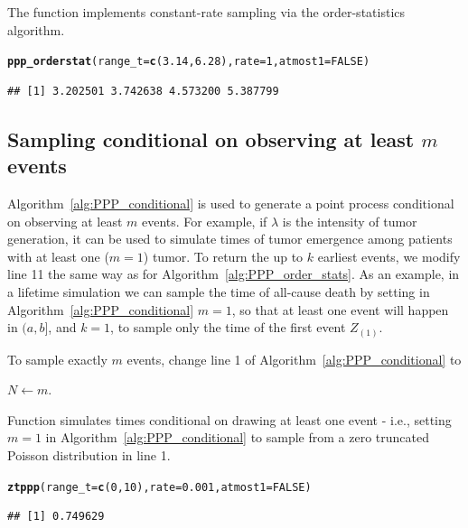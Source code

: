 \documentclass[article,nojss]{jss}\usepackage[]{graphicx}\usepackage[]{xcolor}
\makeatletter
\newcommand{\hlnum}[1]{\textcolor[rgb]{0.686,0.059,0.569}{#1}}%
\newcommand{\hlstd}[1]{\textcolor[rgb]{0.345,0.345,0.345}{#1}}%
\newcommand{\hlkwc}[1]{\textcolor[rgb]{0.333,0.667,0.333}{#1}}%
\newcommand{\hlkwd}[1]{\textcolor[rgb]{0.737,0.353,0.396}{\textbf{#1}}}%
\newenvironment{kframe}{%
 \def\at@end@of@kframe{}%
 \ifinner\ifhmode%
  \def\at@end@of@kframe{\end{minipage}}%
  \begin{minipage}{\columnwidth}%
 \fi\fi%
 \def\FrameCommand##1{\hskip\@totalleftmargin \hskip-\fboxsep
 \colorbox{shadecolor}{##1}\hskip-\fboxsep
     \hskip-\linewidth \hskip-\@totalleftmargin \hskip\columnwidth}%
 \MakeFramed {\advance\hsize-\width
   \@totalleftmargin\z@ \linewidth\hsize
   \@setminipage}}%
 {\par\unskip\endMakeFramed%
 \at@end@of@kframe}
\newenvironment{knitrout}{}{} %
\newcommand{\fct}[1]{\code{#1()}}
\makeatother
\begin{document}
The \fct{ppp\_orderstat} function implements constant-rate sampling via the order-statistics algorithm.

\begin{knitrout}
\color{fgcolor}\begin{kframe}
\begin{alltt}
\hlkwd{ppp_orderstat}\hlstd{(}\hlkwc{range_t} \hlstd{=} \hlkwd{c}\hlstd{(}\hlnum{3.14}\hlstd{,} \hlnum{6.28}\hlstd{),} \hlkwc{rate} \hlstd{=} \hlnum{1}\hlstd{,} \hlkwc{atmost1} \hlstd{=} \hlnum{FALSE}\hlstd{)}
\end{alltt}
\begin{verbatim}
## [1] 3.202501 3.742638 4.573200 5.387799
\end{verbatim}
\end{kframe}
\end{knitrout}

\subsection{Sampling conditional on observing at least $m$ events}\label{sec:PPP_order_stats}



Algorithm~\ref{alg:PPP_conditional} is used to generate a point process conditional on observing at least $m$ events. For example, if $\lambda$ is the intensity of tumor generation, it can be used to simulate times of tumor emergence among patients with at least one ($m=1$) tumor. To return the up to $k$ earliest events, we modify line 11 the same way as for Algorithm~\ref{alg:PPP_order_stats}. As an example, in a lifetime simulation we can sample the time of all-cause death by setting in Algorithm~\ref{alg:PPP_conditional} $m=1$, so that at least one event will happen in $(a, b]$, and $k = 1$, to sample only the time of the first event $Z_{(1)}$.

To sample exactly $m$ events, change line 1 of Algorithm~\ref{alg:PPP_conditional} to
\begin{center}
$N \gets m$.
\end{center}

Function \fct{ztppp} simulates times conditional on drawing at least one event - i.e., setting $m=1$ in Algorithm~\ref{alg:PPP_conditional} to sample from a zero truncated Poisson distribution in line 1.
\begin{knitrout}
\color{fgcolor}\begin{kframe}
\begin{alltt}
\hlkwd{ztppp}\hlstd{(}\hlkwc{range_t} \hlstd{=} \hlkwd{c}\hlstd{(}\hlnum{0}\hlstd{,} \hlnum{10}\hlstd{),} \hlkwc{rate} \hlstd{=} \hlnum{0.001}\hlstd{,} \hlkwc{atmost1} \hlstd{=} \hlnum{FALSE}\hlstd{)}
\end{alltt}
\begin{verbatim}
## [1] 0.749629
\end{verbatim}
\end{kframe}
\end{knitrout}
\end{document}
